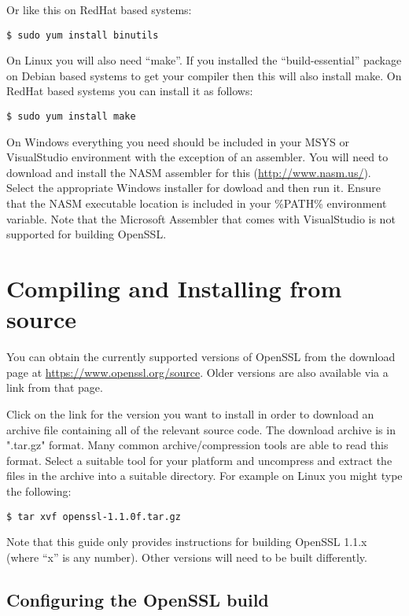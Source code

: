 Or like this on RedHat based systems:

\begin{verbatim}
$ sudo yum install binutils
\end{verbatim}

On Linux you will also need ``make''. If you installed the ``build-essential''
package on Debian based systems to get your compiler then this will also install
make. On RedHat based systems you can install it as follows:

\begin{verbatim}
$ sudo yum install make
\end{verbatim}

On Windows everything you need should be included in your MSYS or VisualStudio
environment with the exception of an assembler. You will need to download and
install the NASM assembler for this (\url{http://www.nasm.us/}). Select the
appropriate Windows installer for dowload and then run it. Ensure that the
NASM executable location is included in your \%PATH\% environment variable. Note
that the Microsoft Assembler that comes with VisualStudio is not supported for
building OpenSSL.

\section{Compiling and Installing from source}

You can obtain the currently supported versions of OpenSSL from the download page at
\url{https://www.openssl.org/source}. Older versions are also available via a link
from that page.

Click on the link for the version you want to install in order to download an archive
file containing all of the relevant source code. The download archive is in ".tar.gz"
format. Many common archive/compression tools are able to read this format. Select a
suitable tool for your platform and uncompress and extract the files in the archive
into a suitable directory. For example on Linux you might type the following:

\begin{verbatim}
$ tar xvf openssl-1.1.0f.tar.gz
\end{verbatim}

Note that this guide only provides instructions for building OpenSSL 1.1.x (where
``x'' is any number). Other versions will need to be built differently.

\subsection{Configuring the OpenSSL build}

